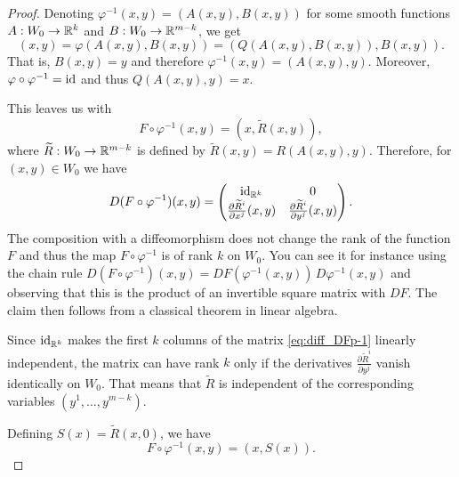 \begin{proof}
  Denoting $\varphi^{-1}(x,y) = (A(x,y), B(x,y))$ for some smooth functions
  $A : W_0 \to \mathbb{R}^k$ and $B : W_0 \to \mathbb{R}^{m-k}$, we get
  \begin{equation}
    (x,y) = \varphi(A(x,y), B(x,y)) = (Q(A(x,y), B(x,y)), B(x,y)).
  \end{equation}
  That is, $B(x,y) = y$ and therefore $\varphi^{-1}(x,y) = (A(x,y), y)$.
  Moreover, $\varphi \circ \varphi^{-1} = \operatorname{id}$ and thus $Q(A(x,y),y) = x$.

  This leaves us with
  \begin{equation}
    F\circ\varphi^{-1}(x,y) = (x, \widetilde{R}(x,y)),
  \end{equation}
  where $\widetilde{R} : W_0 \to\mathbb{R}^{m-k}$ is defined by $\widetilde{R}(x,y) = R(A(x,y), y)$.
  Therefore, for $(x,y)\in W_0$ we have
  \begin{equation}\label{eq:diff_DFp-1}
    D(F\circ\varphi^{-1})(x,y) = \begin{pmatrix}
      \operatorname{id}_{\mathbb{R}^k} & 0 \\
      \frac{\partial\widetilde{R}^i}{\partial x^j}(x,y) & \frac{\partial\widetilde{R}^i}{\partial y^j}(x,y)
    \end{pmatrix}.
  \end{equation}
  The composition with a diffeomorphism does not change the rank of the function $F$ and
  thus the map $F\circ\varphi^{-1}$ is of rank $k$ on $W_0$.
  You can see it for instance using the chain rule
  $D(F\circ\varphi^{-1})(x,y) = DF(\varphi^{-1}(x,y))\, D\varphi^{-1}(x,y)$ and
  observing that this is the product of an invertible square matrix with $DF$.
  The claim then follows from a classical theorem in linear algebra.

  Since $\operatorname{id}_{\mathbb{R}^k}$ makes the first $k$ columns of the matrix \eqref{eq:diff_DFp-1}
  linearly independent, the matrix can have rank $k$ only if the derivatives
  $\frac{\partial \widetilde{R}^i}{\partial y^j}$ vanish identically on $W_0$.
  That means that $\widetilde{R}$ is independent of the corresponding variables
  $(y^1, \ldots, y^{m-k})$.

  Defining $S(x) = \widetilde{R}(x, 0)$, we have
  \begin{equation}
    F\circ\varphi^{-1}(x,y) = (x, S(x)).
  \end{equation}


\end{proof}
